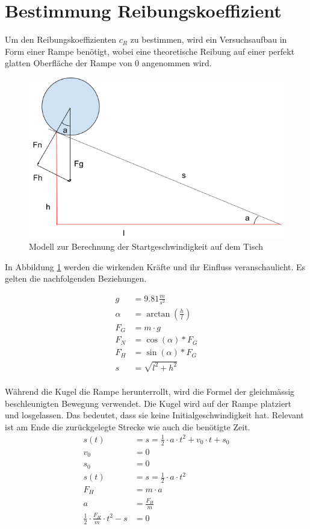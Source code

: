 \section{Bestimmung Reibungskoeffizient}\label{anhang:herleitung:reibungskoeffizient}
Um den Reibungskoeffizienten $c_R$ zu bestimmen, wird ein Versuchsaufbau in Form einer Rampe benötigt, wobei eine
theoretische Reibung auf einer perfekt glatten Oberfläche der Rampe von $0$ angenommen wird.

\begin{figure}[h!]
    \begin{center}
        \includegraphics[width=0.5\linewidth]{../common/07_appendix/resources/00_reibungskoeffizient_rampe.png}
    \end{center}
    \caption{Modell zur Berechnung der Startgeschwindigkeit auf dem Tisch}
    \label{fig:modell_berechnung_startgeschwindigkeit}
\end{figure}

In Abbildung \ref{fig:modell_berechnung_startgeschwindigkeit} werden die wirkenden Kräfte und ihr Einfluss veranschaulicht.
Es gelten die nachfolgenden Beziehungen.

\begin{align}
    g &= 9.81 \frac{m}{s^2}\\
    \alpha &= \arctan(\frac{h}{l})\\
    F_G &= m \cdot g\\
    F_N &= \cos(\alpha) * F_G\\
    F_H &= \sin(\alpha) * F_G\\
    s &= \sqrt{l^2 + h^2}\\
\end{align}

Während die Kugel die Rampe herunterrollt, wird die Formel der gleichmässig beschleunigten Bewegung verwendet.
Die Kugel wird auf der Rampe platziert und losgelassen. Das bedeutet, dass sie keine Initialgeschwindigkeit hat.
Relevant ist am Ende die zurückgelegte Strecke wie auch die benötigte Zeit.
\begin{align}
    s(t) &= s = \frac{1}{2} \cdot a \cdot t^2 + v_0 \cdot t + s_0\\
    v_0 &= 0\\
    s_0 &= 0\\
    s(t) &= s = \frac{1}{2} \cdot a \cdot t^2\\
    F_H &= m \cdot a\\
    a &= \frac{F_H}{m}\\
    \frac{1}{2} \cdot \frac{F_H}{m} \cdot t^2 - s &= 0
\end{align}

